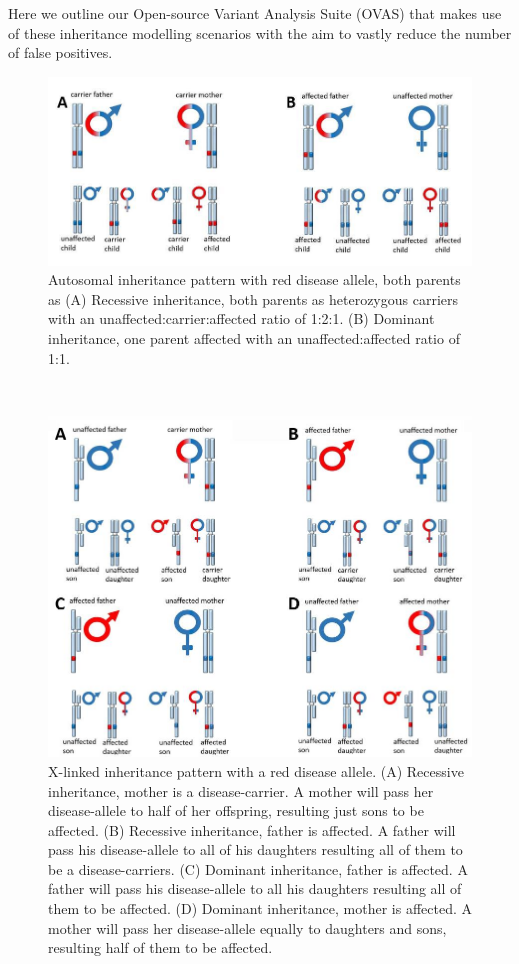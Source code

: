 \documentclass{bioinfo}
\def\app{OVAS}
\begin{document}
Here we outline our Open-source Variant Analysis Suite (\app{}) that makes use of these inheritance modelling scenarios with the aim to vastly reduce the number of false positives.

\begin{figure}[!tpb]
  \centerline{\includegraphics[natwidth=250bp,natheight=111bp]{inh_autosomal.jpg}}\caption{Autosomal inheritance pattern with red disease allele, both parents as 
(A) Recessive inheritance, both parents as heterozygous carriers with an unaffected:carrier:affected ratio of 1:2:1.
(B) Dominant inheritance, one parent affected with an unaffected:affected ratio of 1:1.}\label{fig:inheritance}
\end{figure}\
\begin{figure}[!tpb]
  \centerline{\includegraphics[natwidth=250bp,natheight=201bp]{inh_xlinked.jpg}}\caption{X-linked inheritance pattern with a red disease allele. (A) Recessive inheritance, mother is a disease-carrier. A mother will pass her disease-allele to half of her offspring, resulting just sons to be affected. (B) Recessive inheritance, father is affected. A father will pass his disease-allele to all of his daughters resulting all of them to be a disease-carriers. (C) Dominant inheritance, father is affected. A father will pass his disease-allele to all his daughters resulting all of them to be affected. (D) Dominant inheritance, mother is affected. A mother will pass her disease-allele equally to daughters and sons, resulting half of them to be affected.}\label{fig:inheritancex}
\end{figure}
\end{document}
